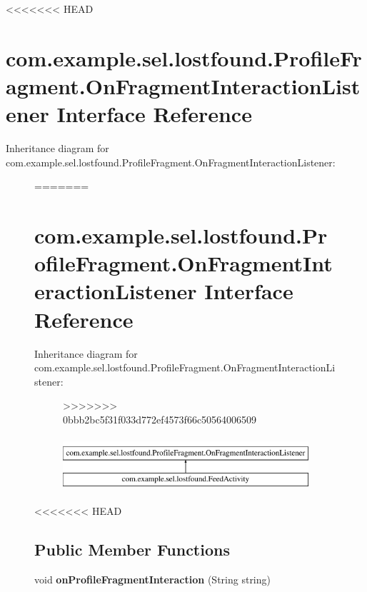 <<<<<<< HEAD
\hypertarget{interfacecom_1_1example_1_1sel_1_1lostfound_1_1ProfileFragment_1_1OnFragmentInteractionListener}{\section{com.\-example.\-sel.\-lostfound.\-Profile\-Fragment.\-On\-Fragment\-Interaction\-Listener Interface Reference}
\label{interfacecom_1_1example_1_1sel_1_1lostfound_1_1ProfileFragment_1_1OnFragmentInteractionListener}
}
Inheritance diagram for com.\-example.\-sel.\-lostfound.\-Profile\-Fragment.\-On\-Fragment\-Interaction\-Listener\-:\begin{figure}[H]
=======
\hypertarget{interfacecom_1_1example_1_1sel_1_1lostfound_1_1ProfileFragment_1_1OnFragmentInteractionListener}{\section{com.\-example.\-sel.\-lostfound.\-Profile\-Fragment.\-On\-Fragment\-Interaction\-Listener \-Interface \-Reference}
\label{interfacecom_1_1example_1_1sel_1_1lostfound_1_1ProfileFragment_1_1OnFragmentInteractionListener}
}
\-Inheritance diagram for com.\-example.\-sel.\-lostfound.\-Profile\-Fragment.\-On\-Fragment\-Interaction\-Listener\-:\begin{figure}[H]
>>>>>>> 0bbb2bc5f31f033d772ef4573f66c50564006509
\begin{center}
\leavevmode
\includegraphics[height=2.000000cm]{interfacecom_1_1example_1_1sel_1_1lostfound_1_1ProfileFragment_1_1OnFragmentInteractionListener}
\end{center}
\end{figure}
<<<<<<< HEAD
\subsection*{Public Member Functions}
\begin{DoxyCompactItemize}
\item 
\hypertarget{interfacecom_1_1example_1_1sel_1_1lostfound_1_1ProfileFragment_1_1OnFragmentInteractionListener_af75f735b544a4f6c22f58e2f0ea5c671}{void {\bfseries on\-Profile\-Fragment\-Interaction} (String string)}\label{interfacecom_1_1example_1_1sel_1_1lostfound_1_1ProfileFragment_1_1OnFragmentInteractionListener_af75f735b544a4f6c22f58e2f0ea5c671}


\end{DoxyCompactItemize}
\end{figure}
